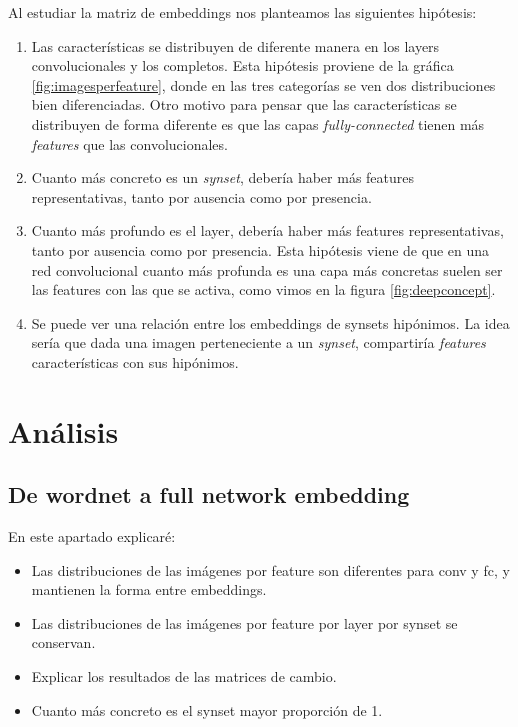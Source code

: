 \documentclass[12,twoside]{TFG-GM}
\theoremstyle{definition}
\theoremstyle{remark}
\begin{document}
Al estudiar la matriz de embeddings nos planteamos las siguientes hipótesis: 
\begin{enumerate}
\item \label{h1} Las características se distribuyen de diferente manera en los layers convolucionales y los completos. Esta hipótesis proviene de la gráfica \ref{fig:imagesperfeature}, donde 
en las tres categorías se ven dos distribuciones bien diferenciadas. Otro motivo para pensar que las características se distribuyen de forma diferente es que las capas \textit{fully-connected} tienen más \textit{features} que las convolucionales.
\item \label{h2} Cuanto más concreto es un \textit{synset}, debería haber más features representativas, tanto por ausencia como por presencia.
\item \label{h3} Cuanto más profundo es el layer, debería haber más features representativas, tanto por ausencia como por presencia. Esta hipótesis viene de que en una red convolucional cuanto más profunda es una capa más concretas suelen ser las features con las que se activa, como vimos en la figura \ref{fig:deepconcept}.
\item \label{h4} Se puede ver una relación entre los embeddings de synsets hipónimos. La idea sería que dada una imagen perteneciente a un \textit{synset}, compartiría \textit{features} características con sus hipónimos.
\end{enumerate}


\newpage
\section{Análisis}
\subsection{De wordnet a full network embedding}
En este apartado explicaré: 

\begin{itemize}
\item Las distribuciones de las imágenes por feature son diferentes para conv y fc, y mantienen la forma entre embeddings.
\item Las distribuciones de las imágenes por feature por layer por synset se conservan. 
\item Explicar los resultados de las matrices de cambio. 
\item Cuanto más concreto es el synset mayor proporción de 1. 

\end{itemize}
\end{document}
